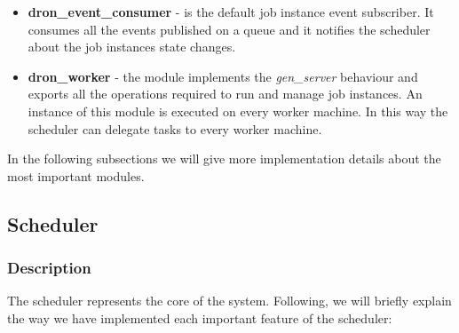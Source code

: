 \documentclass[11pt,a4paper,twoside]{report}
\begin{document}
\begin{itemize}
\item{}
\textbf{dron\_event\_consumer} - is the default job instance event subscriber. It consumes all the events published on a queue and it notifies the scheduler about the job instances state changes.
\item{}
\textbf{dron\_worker} - the module implements the \textit{gen\_server} behaviour and exports all the operations required to run and manage job instances. An instance of this module is executed on every worker machine. In this way the scheduler can delegate tasks to every worker machine.
\end{itemize}


In the following subsections we will give more implementation details about the most important modules.

\subsection{Scheduler}

\subsubsection{Description}
The scheduler represents the core of the system. Following, we will briefly explain the way we have implemented each important feature of the scheduler:
\end{document}
